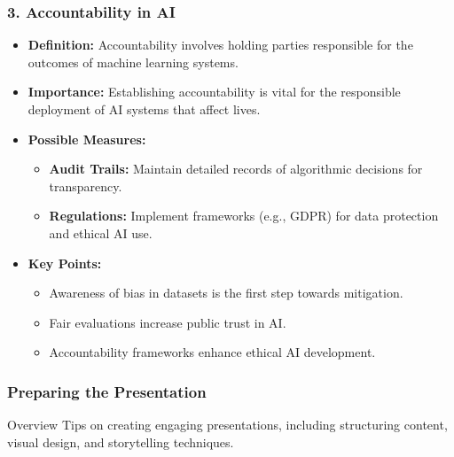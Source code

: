 \documentclass{beamer}
\begin{document}
\begin{frame}[fragile]
    \frametitle{3. Accountability in AI}
    \begin{itemize}
        \item \textbf{Definition:} 
        Accountability involves holding parties responsible for the outcomes of machine learning systems.
        
        \item \textbf{Importance:} 
        Establishing accountability is vital for the responsible deployment of AI systems that affect lives.
        
        \item \textbf{Possible Measures:}
        \begin{itemize}
            \item \textbf{Audit Trails:} Maintain detailed records of algorithmic decisions for transparency.
            \item \textbf{Regulations:} Implement frameworks (e.g., GDPR) for data protection and ethical AI use.
        \end{itemize}
        
        \item \textbf{Key Points:}
        \begin{itemize}
            \item Awareness of bias in datasets is the first step towards mitigation.
            \item Fair evaluations increase public trust in AI.
            \item Accountability frameworks enhance ethical AI development.
        \end{itemize}
    \end{itemize}
\end{frame}

\begin{frame}[fragile]
    \frametitle{Preparing the Presentation}
    \begin{block}{Overview}
        Tips on creating engaging presentations, including structuring content, visual design, and storytelling techniques.
    \end{block}
\end{frame}
\end{document}
